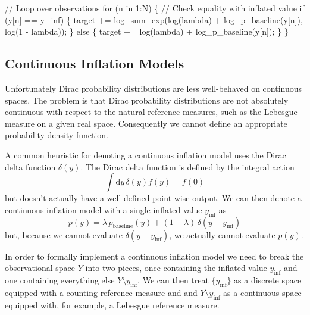 \documentclass[
  letterpaper,
  DIV=11,
  numbers=noendperiod]{scrartcl}
\newenvironment{Shaded}{\begin{snugshade}}{\end{snugshade}}
\newcommand{\CommentTok}[1]{\textcolor[rgb]{0.37,0.37,0.37}{#1}}
\newcommand{\ControlFlowTok}[1]{\textcolor[rgb]{0.00,0.23,0.31}{#1}}
\newcommand{\DecValTok}[1]{\textcolor[rgb]{0.68,0.00,0.00}{#1}}
\newcommand{\KeywordTok}[1]{\textcolor[rgb]{0.00,0.23,0.31}{#1}}
\newcommand{\NormalTok}[1]{\textcolor[rgb]{0.00,0.23,0.31}{#1}}
\begin{document}
\begin{Shaded}
\begin{Highlighting}[]
\CommentTok{// Loop over observations}
\ControlFlowTok{for}\NormalTok{ (n }\ControlFlowTok{in} \DecValTok{1}\NormalTok{:N) \{}
  \CommentTok{// Check equality with inflated value}
  \ControlFlowTok{if}\NormalTok{ (y[n] == y\_inf) \{}
    \KeywordTok{target +=}\NormalTok{ log\_sum\_exp(log(lambda) + log\_p\_baseline(y[n]),}
\NormalTok{                          log(}\DecValTok{1}\NormalTok{ {-} lambda));}
\NormalTok{  \} }\ControlFlowTok{else}\NormalTok{ \{}
    \KeywordTok{target +=}\NormalTok{ log(lambda) + log\_p\_baseline(y[n]);}
\NormalTok{  \}}
\NormalTok{\}}
\end{Highlighting}
\end{Shaded}

\subsection{Continuous Inflation Models}\label{sec:cont_infl}

Unfortunately Dirac probability distributions are less well-behaved on
continuous spaces. The problem is that Dirac probability distributions
are not absolutely continuous with respect to the natural reference
measures, such as the Lebesgue measure on a given real space.
Consequently we cannot define an appropriate probability density
function.

A common heuristic for denoting a continuous inflation model uses the
Dirac delta function \(\delta(y)\). The Dirac delta function is defined
by the integral action \[
\int \mathrm{d} y \, \delta(y) f(y) = f(0)
\] but doesn't actually have a well-defined point-wise output. We can
then denote a continuous inflation model with a single inflated value
\(y_{\mathrm{inf}}\) as \[
p(y)
=
  \lambda       \, p_{\mathrm{baseline}}(y)
+ (1 - \lambda) \, \delta(y - y_{\mathrm{inf}})
\] but, because we cannot evaluate \(\delta(y - y_{\mathrm{inf}})\), we
actually cannot evaluate \(p(y)\).

In order to formally implement a continuous inflation model we need to
break the observational space \(Y\) into two pieces, once containing the
inflated value \(y_{\mathrm{inf}}\) and one containing everything else
\(Y \setminus y_{\mathrm{inf}}\). We can then treat
\(\{ y_{\mathrm{inf}}\}\) as a discrete space equipped with a counting
reference measure and and \(Y \setminus y_{\mathrm{inf}}\) as a
continuous space equipped with, for example, a Lebesgue reference
measure.
\end{document}
